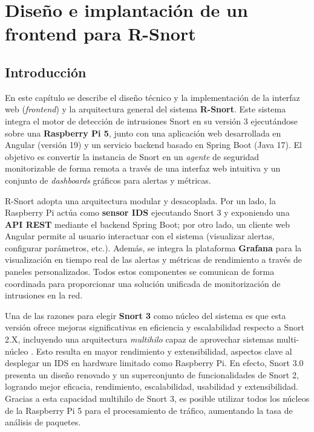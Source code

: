 \documentclass[11pt,a4paper,twoside]{report}
\begin{document}
\clearpage
\null
\thispagestyle{empty}
\newpage
\chapter{Diseño e implantación de un frontend para R-Snort}

\section{Introducción}
En este capítulo se describe el diseño técnico y la implementación de la interfaz web (\emph{frontend}) y la arquitectura general del sistema \textbf{R-Snort}. Este sistema integra el motor de detección de intrusiones Snort en su versión 3 ejecutándose sobre una \textbf{Raspberry Pi 5}, junto con una aplicación web desarrollada en Angular (versión 19) y un servicio backend basado en Spring Boot (Java 17). El objetivo es convertir la instancia de Snort en un \emph{agente} de seguridad monitorizable de forma remota a través de una interfaz web intuitiva y un conjunto de \emph{dashboards} gráficos para alertas y métricas.\newline

R-Snort adopta una arquitectura modular y desacoplada. Por un lado, la Raspberry Pi actúa como \textbf{sensor IDS} ejecutando Snort 3 y exponiendo una \textbf{API REST} mediante el backend Spring Boot; por otro lado, un cliente web Angular permite al usuario interactuar con el sistema (visualizar alertas, configurar parámetros, etc.). Además, se integra la plataforma \textbf{Grafana} para la visualización en tiempo real de las alertas y métricas de rendimiento a través de paneles personalizados. Todos estos componentes se comunican de forma coordinada para proporcionar una solución unificada de monitorización de intrusiones en la red.\newline

Una de las razones para elegir \textbf{Snort 3} como núcleo del sistema es que esta versión ofrece mejoras significativas en eficiencia y escalabilidad respecto a Snort 2.X, incluyendo una arquitectura \emph{multihilo} capaz de aprovechar sistemas multi-núcleo \cite{snort3differences}. Esto resulta en mayor rendimiento y extensibilidad, aspectos clave al desplegar un IDS en hardware limitado como Raspberry Pi. En efecto, Snort 3.0 presenta un diseño renovado y un superconjunto de funcionalidades de Snort 2, logrando mejor eficacia, rendimiento, escalabilidad, usabilidad y extensibilidad. Gracias a esta capacidad multihilo de Snort 3, es posible utilizar todos los núcleos de la Raspberry Pi 5 para el procesamiento de tráfico, aumentando la tasa de análisis de paquetes.\newline
\end{document}

